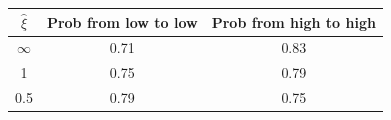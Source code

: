 \begin{tabular}{ccc}
\hline
\rule{0pt}{1.2em}
$\widehat \xi$  &Prob from low to low& Prob from high to high \\
\hline
$\infty$ &  0.71 & 0.83 \\
1 &  0.75 & 0.79 \\
0.5 &  0.79 & 0.75 \\


\hline
\end{tabular}
